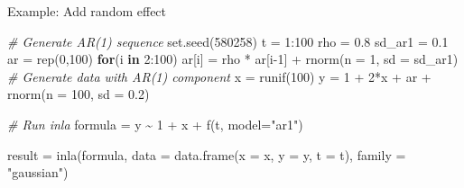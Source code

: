 \documentclass[
  handout]{beamer}
\newenvironment{Shaded}{\begin{snugshade}}{\end{snugshade}}
\newcommand{\AttributeTok}[1]{\textcolor[rgb]{0.77,0.63,0.00}{#1}}
\newcommand{\CommentTok}[1]{\textcolor[rgb]{0.56,0.35,0.01}{\textit{#1}}}
\newcommand{\ControlFlowTok}[1]{\textcolor[rgb]{0.13,0.29,0.53}{\textbf{#1}}}
\newcommand{\DecValTok}[1]{\textcolor[rgb]{0.00,0.00,0.81}{#1}}
\newcommand{\FloatTok}[1]{\textcolor[rgb]{0.00,0.00,0.81}{#1}}
\newcommand{\FunctionTok}[1]{\textcolor[rgb]{0.00,0.00,0.00}{#1}}
\newcommand{\NormalTok}[1]{#1}
\newcommand{\OtherTok}[1]{\textcolor[rgb]{0.56,0.35,0.01}{#1}}
\newcommand{\SpecialCharTok}[1]{\textcolor[rgb]{0.00,0.00,0.00}{#1}}
\newcommand{\StringTok}[1]{\textcolor[rgb]{0.31,0.60,0.02}{#1}}
\begin{document}
\begin{frame}[fragile]{Example: Add random effect}
\protect\hypertarget{example-add-random-effect-1}{}
\small

\begin{Shaded}
\begin{Highlighting}[]
\CommentTok{\# Generate AR(1) sequence}
\FunctionTok{set.seed}\NormalTok{(}\DecValTok{580258}\NormalTok{)}
\NormalTok{t }\OtherTok{=} \DecValTok{1}\SpecialCharTok{:}\DecValTok{100}
\NormalTok{rho }\OtherTok{=} \FloatTok{0.8}
\NormalTok{sd\_ar1 }\OtherTok{=} \FloatTok{0.1}
\NormalTok{ar }\OtherTok{=} \FunctionTok{rep}\NormalTok{(}\DecValTok{0}\NormalTok{,}\DecValTok{100}\NormalTok{)}
\ControlFlowTok{for}\NormalTok{(i }\ControlFlowTok{in} \DecValTok{2}\SpecialCharTok{:}\DecValTok{100}\NormalTok{)}
\NormalTok{  ar[i] }\OtherTok{=}\NormalTok{ rho }\SpecialCharTok{*}\NormalTok{ ar[i}\DecValTok{{-}1}\NormalTok{] }\SpecialCharTok{+} \FunctionTok{rnorm}\NormalTok{(}\AttributeTok{n =} \DecValTok{1}\NormalTok{, }\AttributeTok{sd =}\NormalTok{ sd\_ar1)}
\CommentTok{\# Generate data with AR(1) component}
\NormalTok{x }\OtherTok{=} \FunctionTok{runif}\NormalTok{(}\DecValTok{100}\NormalTok{)}
\NormalTok{y }\OtherTok{=} \DecValTok{1} \SpecialCharTok{+} \DecValTok{2}\SpecialCharTok{*}\NormalTok{x }\SpecialCharTok{+}\NormalTok{ ar }\SpecialCharTok{+} \FunctionTok{rnorm}\NormalTok{(}\AttributeTok{n =} \DecValTok{100}\NormalTok{, }\AttributeTok{sd =} \FloatTok{0.2}\NormalTok{)}

\CommentTok{\# Run inla}
\NormalTok{formula }\OtherTok{=}\NormalTok{ y }\SpecialCharTok{\textasciitilde{}} \DecValTok{1} \SpecialCharTok{+}\NormalTok{ x }\SpecialCharTok{+} \FunctionTok{f}\NormalTok{(t, }\AttributeTok{model=}\StringTok{"ar1"}\NormalTok{)}

\NormalTok{result }\OtherTok{=} \FunctionTok{inla}\NormalTok{(formula,}
     \AttributeTok{data =} \FunctionTok{data.frame}\NormalTok{(}\AttributeTok{x =}\NormalTok{ x, }\AttributeTok{y =}\NormalTok{ y, }\AttributeTok{t =}\NormalTok{ t),}
     \AttributeTok{family =} \StringTok{"gaussian"}\NormalTok{)}
\end{Highlighting}
\end{Shaded}

\normalsize
\end{frame}
\end{document}
